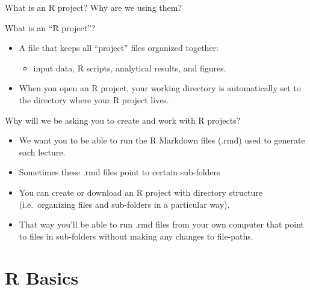 \documentclass[8pt,ignorenonframetext,dvipsnames]{beamer}
\providecommand{\tightlist}{%
  \setlength{\itemsep}{0pt}\setlength{\parskip}{0pt}}
\let\olditem\item
\renewcommand{\item}{%
  \olditem\vspace{4pt}
}
\begin{document}
\begin{frame}{What is an R project? Why are we using them?}
\protect\hypertarget{what-is-an-r-project-why-are-we-using-them}{}

What is an ``R project''?

\begin{itemize}
\tightlist
\item
  A file that keeps all ``project'' files organized together:

  \begin{itemize}
  \tightlist
  \item
    input data, R scripts, analytical results, and figures.
  \end{itemize}
\item
  When you open an R project, your working directory is automatically
  set to the directory where your R project lives.
\end{itemize}

Why will we be asking you to create and work with R projects?

\begin{itemize}
\tightlist
\item
  We want you to be able to run the R Markdown files (.rmd) used to
  generate each lecture.
\item
  Sometimes these .rmd files point to certain sub-folders
\item
  You can create or download an R project with directory structure
  (i.e.~organizing files and sub-folders in a particular way).
\item
  That way you'll be able to run .rmd files from your own computer that
  point to files in sub-folders without making any changes to
  file-paths.
\end{itemize}

\end{frame}

\hypertarget{r-basics}{%
\section{R Basics}\label{r-basics}}
\end{document}
